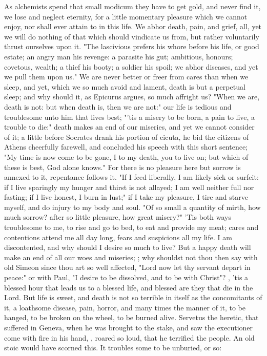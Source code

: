 {As alchemists spend that small modicum they have to get gold, and never find it, we lose and neglect eternity, for a little momentary pleasure which we cannot enjoy, nor shall ever attain to in this life. We abhor death, pain, and grief, all, yet we will do nothing of that which should vindicate us from, but rather voluntarily thrust ourselves upon it. "The lascivious prefers his whore before his life, or good estate; an angry man his revenge: a parasite his gut; ambitious, honours; covetous, wealth; a thief his booty; a soldier his spoil; we abhor diseases, and yet we pull them upon us." We are never better or freer from cares than when we sleep, and yet, which we so much avoid and lament, death is but a perpetual sleep; and why should it, as Epicurus argues, so much affright us? "When we are, death is not: but when death is, then we are not:" our life is tedious and troublesome unto him that lives best; "'tis a misery to be born, a pain to live, a trouble to die:" death makes an end of our miseries, and yet we cannot consider of it; a little before Socrates drank his portion of cicuta, he bid the citizens of Athens cheerfully farewell, and concluded his speech with this short sentence; "My time is now come to be gone, I to my death, you to live on; but which of these is best, God alone knows." For there is no pleasure here but sorrow is annexed to it, repentance follows it. "If I feed liberally, I am likely sick or surfeit: if I live sparingly my hunger and thirst is not allayed; I am well neither full nor fasting; if I live honest, I burn in lust;" if I take my pleasure, I tire and starve myself, and do injury to my body and soul. "Of so small a quantity of mirth, how much sorrow? after so little pleasure, how great misery?" 'Tis both ways troublesome to me, to rise and go to bed, to eat and provide my meat; cares and contentions attend me all day long, fears and suspicions all my life. I am discontented, and why should I desire so much to live? But a happy death will make an end of all our woes and miseries; ; why shouldst not thou then say with old Simeon since thou art so well affected, "Lord now let thy servant depart in peace:" or with Paul, "I desire to be dissolved, and to be with Christ"? , 'tis a blessed hour that leads us to a blessed life, and blessed are they that die in the Lord. But life is sweet, and death is not so terrible in itself as the concomitants of it, a loathsome disease, pain, horror, \etc{} and many times the manner of it, to be hanged, to be broken on the wheel, to be burned alive. Servetus the heretic, that suffered in Geneva, when he was brought to the stake, and saw the executioner come with fire in his hand, , roared so loud, that he terrified the people. An old stoic would have scorned this. It troubles some to be unburied, or so:

}
